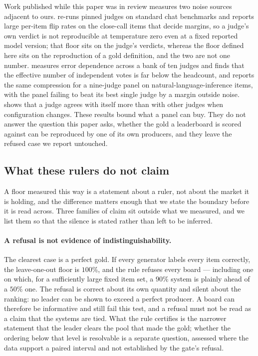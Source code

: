 \documentclass{article}
\begin{document}
Work published while this paper was in review measures two noise sources adjacent to ours. \cite{ayyagari2026pinned} re-runs pinned judges on standard chat benchmarks and reports large per-item flip rates on the close-call items that decide margins, so a judge's own verdict is not reproducible at temperature zero even at a fixed reported model version; that floor sits on the judge's verdicts, whereas the floor defined here sits on the reproduction of a gold definition, and the two are not one number. \cite{hossain2026agreement} measures error dependence across a bank of ten judges and finds that the effective number of independent votes is far below the headcount, and \cite{kohli2026nine} reports the same compression for a nine-judge panel on natural-language-inference items, with the panel failing to beat its best single judge by a margin outside noise. \cite{kassler2026measuring} shows that a judge agrees with itself more than with other judges when configuration changes. These results bound what a panel can buy. They do not answer the question this paper asks, whether the gold a leaderboard is scored against can be reproduced by one of its own producers, and they leave the refused case we report untouched.

\subsection{What these rulers do not claim}
\label{sec:notclaim} A floor measured this way is a statement about a ruler, not about the market it is holding, and the difference matters enough that we state the boundary before it is read across. Three families of claim sit outside what we measured, and we list them so that the silence is stated rather than left to be inferred.

\paragraph{A refusal is not evidence of indistinguishability.} The clearest case is a perfect gold. If every generator labels every item correctly, the leave-one-out floor is $100\%$, and the rule refuses every board --- including one on which, for a sufficiently large fixed item set, a $90\%$ system is plainly ahead of a $50\%$ one. The refusal is correct about its own quantity and silent about the ranking: no leader can be shown to exceed a perfect producer. A board can therefore be informative and still fail this test, and a refusal must not be read as a claim that the systems are tied. What the rule certifies is the narrower statement that the leader clears the pool that made the gold; whether the ordering below that level is resolvable is a separate question, assessed where the data support a paired interval and not established by the gate's refusal.
\end{document}
